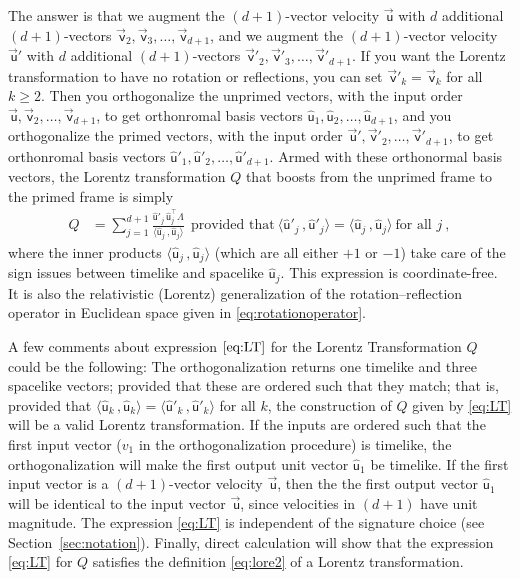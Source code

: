 \documentclass{article}
\newcommand\upvec[1]{\!\vec{\,\mathrm{#1}}}
\newcommand{\Lvec}[1]{\upvec{\mathsf{#1}}} %
\newcommand{\Lhat}[1]{\hat{\mathsf{#1}}} %
\newcommand{\inner}[2]{\langle{#1}\,,{#2}\rangle}
\newcommand{\plus}{\!+\!} %
\newcommand{\secref}[1]{Section~\ref{#1}}
\begin{document}
The answer is that we augment the $(d\plus1)$-vector velocity $\Lvec{u}$ with $d$ additional $(d\plus1)$-vectors $\Lvec{v}_2,\Lvec{v}_3,\ldots,\Lvec{v}_{d+1}$, and we augment the $(d\plus1)$-vector velocity $\Lvec{u}'$ with $d$ additional $(d\plus1)$-vectors $\Lvec{v}'_2,\Lvec{v}'_3,\ldots,\Lvec{v}'_{d+1}$.
If you want the Lorentz transformation to have no rotation or reflections, you can set $\Lvec{v}'_k=\Lvec{v}_k$ for all $k\geq 2$.
Then you orthogonalize the unprimed vectors, with the input order $\Lvec{u},\Lvec{v}_2,\ldots,\Lvec{v}_{d+1}$, to get orthonromal basis vectors $\Lhat{u}_1,\Lhat{u}_2,\ldots,\Lhat{u}_{d+1}$, and you orthogonalize the primed vectors, with the input order $\Lvec{u}',\Lvec{v}'_2,\ldots,\Lvec{v}'_{d+1}$, to get orthonromal basis vectors $\Lhat{u}'_1,\Lhat{u}'_2,\ldots,\Lhat{u}'_{d+1}$.
Armed with these orthonormal basis vectors, the Lorentz transformation $Q$ that boosts from the unprimed frame to the primed frame is simply
\begin{align}
    Q &= \sum_{j=1}^{d+1} \frac{\Lhat{u}'_j\,\Lhat{u}_j^\top\Lambda}{\inner{\Lhat{u}_j}{\Lhat{u}_j}} ~~ \mbox{provided that} ~ \inner{\Lhat{u}'_j}{\Lhat{u}'_j} = \inner{\Lhat{u}_j}{\Lhat{u}_j} ~ \mbox{for all $j$} ~,\label{eq:LT}
\end{align}
where the inner products $\inner{\Lhat{u}_j}{\Lhat{u}_j}$ (which are all either $+1$ or $-1$) take care of the sign issues between timelike and spacelike $\Lhat{u}_j$.
This expression is coordinate-free.
It is also the relativistic (Lorentz) generalization of the rotation--reflection operator in Euclidean space given in \eqref{eq:rotationoperator}.

A few comments about expression $\eqref{eq:LT}$ for the Lorentz Transformation $Q$ could be the following:
The orthogonalization returns one timelike and three spacelike vectors;
provided that these are ordered such that they match; that is, provided that $\inner{\Lhat{u}_k}{\Lhat{u}_k}=\inner{\Lhat{u}'_k}{\Lhat{u}'_k}$ for all $k$, the construction of $Q$ given by \eqref{eq:LT} will be a valid Lorentz transformation.
If the inputs are ordered such that the first input vector ($v_1$ in the orthogonalization procedure) is timelike, the orthogonalization will make the first output unit vector $\Lhat{u}_1$ be timelike.
If the first input vector is a $(d\plus1)$-vector velocity $\Lvec{u}$, then the the first output vector $\Lhat{u}_1$ will be identical to the input vector $\Lvec{u}$, since velocities in $(d\plus1)$ have unit magnitude.
The expression \eqref{eq:LT} is independent of the signature choice (see \secref{sec:notation}).
Finally, direct calculation will show that the expression \eqref{eq:LT} for $Q$ satisfies the definition \eqref{eq:lore2} of a Lorentz transformation.
\end{document}
